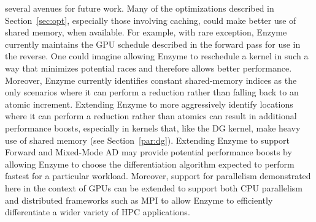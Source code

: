  several avenues for future work. Many of the optimizations described in Section~\ref{sec:opt}, especially those involving caching, could make better use of shared memory, when available. For example, with rare exception, Enzyme currently maintains the GPU schedule described in the forward pass for use in the reverse. One could imagine allowing Enzyme to reschedule a kernel in such a way that minimizes potential races and therefore allows better performance. Moreover, Enzyme currently identifies constant shared-memory indices as the only scenarios where it can perform a reduction rather than falling back to an atomic increment. Extending Enzyme to more aggressively identify locations where it can perform a reduction rather than atomics can result in additional performance boosts, especially in kernels that, like the DG kernel, make heavy use of shared memory (see Section~\ref{par:dg}). Extending Enzyme to support Forward and Mixed-Mode \cite{besard2018juliagpu} AD may provide potential performance boosts by allowing Enzyme to choose the differentiation algorithm expected to perform fastest for a particular workload. Moreover, support for parallelism demonstrated here in the context of GPUs can be extended to support both CPU parallelism and distributed frameworks such as MPI to allow Enzyme to efficiently differentiate a wider variety of HPC applications.